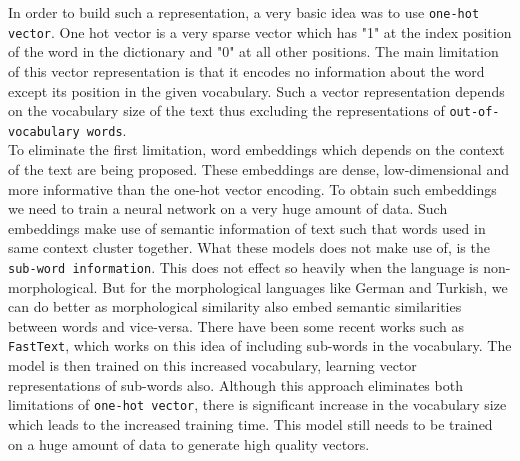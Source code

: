 In order to build such a representation, a very basic idea was to use \texttt{one-hot vector}. One hot vector is a very sparse vector which has "1" at the index position of the word in the dictionary and "0" at all other positions. The main limitation of this vector representation is that it encodes no information about the word except its position in the given vocabulary. Such a vector representation depends on the vocabulary size of the text thus excluding the representations of \texttt{out-of-vocabulary words}.\\
To eliminate the first limitation, word embeddings which depends on the context of the text are being proposed. These embeddings are dense, low-dimensional and more informative than the one-hot vector encoding. To obtain such embeddings we need to train a neural network on a very huge amount of data. Such embeddings make use of semantic information of text such that words used in same context cluster together. What these models does not make use of, is the \texttt{sub-word information}. This does not effect so heavily when the language is non-morphological. But for the morphological languages like German and Turkish, we can do better as morphological similarity also embed semantic similarities between words and vice-versa. There have been some recent works such as \texttt{FastText}, which works on this idea of including sub-words in the vocabulary. The model is then trained on this increased vocabulary, learning vector representations of sub-words also. Although this approach eliminates both limitations of \texttt{one-hot vector}, there is significant increase in the vocabulary size which leads to the increased training time. This model still needs to be trained on a huge amount of data to generate high quality vectors.
